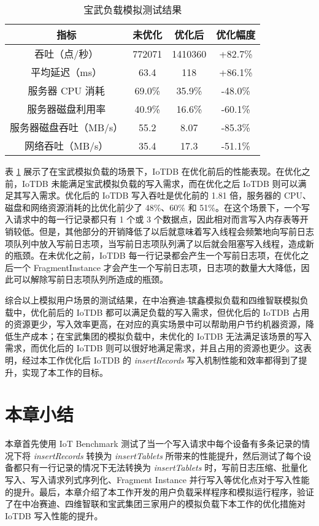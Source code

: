 \begin{table}
  \centering
  \caption{宝武负载模拟测试结果}
  \begin{tabular}{cccc}
    \toprule 
    指标 &  未优化  & 优化后 & 优化幅度 \\
    \midrule
    吞吐（点/秒） & 772071 & 1410360 & +82.7\%\\  
    平均延迟（ms） & 63.4 & 118 & +86.1\%\\  
    服务器 CPU 消耗 & 69.0\% & 35.9\% & -48.0\%\\  
    服务器磁盘利用率 & 40.9\% & 16.6\% & -60.1\%\\  
    服务器磁盘吞吐（MB/s） & 55.2 & 8.07 & -85.3\% \\  
    网络吞吐（MB/s） & 35.4 & 17.3 & -51.1\%\\ 
    \bottomrule
  \end{tabular}
  \label{tabular:bw-performance}
\end{table}
表 \ref{tabular:bw-performance} 展示了在宝武模拟负载的场景下，IoTDB 在优化前后的性能表现。在优化之前，IoTDB 未能满足宝武模拟负载的写入需求，而在优化之后 IoTDB 则可以满足其写入需求。优化后的 IoTDB 写入吞吐是优化前的 1.81 倍，服务器的 CPU、磁盘和网络资源消耗的比优化前少了 48\%、60\% 和 51\%。在这个场景下，一个写入请求中的每一行记录都只有 1 个或 3 个数据点，因此相对而言写入内存表等开销较低。但是，其他部分的开销降低了以后就意味着写入线程会频繁地向写前日志项队列中放入写前日志项，当写前日志项队列满了以后就会阻塞写入线程，造成新的瓶颈。在未优化之前，IoTDB 每一行记录都会产生一个写前日志项，在优化之后一个 FragmentInstance 才会产生一个写前日志项，日志项的数量大大降低，因此可以解除写前日志项队列所造成的瓶颈。

综合以上模拟用户场景的测试结果，在中冶赛迪-镔鑫模拟负载和四维智联模拟负载中，优化前后的 IoTDB 都可以满足负载的写入需求，但优化后的 IoTDB 占用的资源更少，写入效率更高，在对应的真实场景中可以帮助用户节约机器资源，降低生产成本；在宝武集团的模拟负载中，未优化的 IoTDB 无法满足该场景的写入需求，而优化后的 IoTDB 则可以很好地满足需求，并且占用的资源也更少。这表明，经过本工作优化后 IoTDB 的 \emph{insertRecords} 写入机制性能和效率都得到了提升，实现了本工作的目标。
\section{本章小结}
本章首先使用 IoT Benchmark 测试了当一个写入请求中每个设备有多条记录的情况下将 \emph{insertRecords} 转换为 \emph{insertTablets} 所带来的性能提升，然后测试了每个设备都只有一行记录的情况下无法转换为 \emph{insertTablets} 时，写前日志压缩、批量化写入、写入请求列式序列化、Fragment Instance 并行写入等优化点对于写入性能的提升。最后，本章介绍了本工作开发的用户负载采样程序和模拟运行程序，验证了在中冶赛迪、四维智联和宝武集团三家用户的模拟负载下本工作的优化措施对 IoTDB 写入性能的提升。